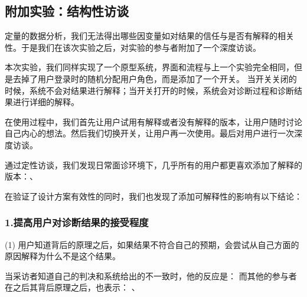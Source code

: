 









\subsection{附加实验：结构性访谈}

定量的数据分析，我们无法得出哪些因变量如对结果的信任与是否有解释的相关性。于是我们在该次实验之后，对实验的参与者附加了一个深度访谈。

本次实验，我们同样实现了一个原型系统，界面和流程与上一个实验完全相同，但是去掉了用户登录时的随机分配用户角色，而是添加了一个开关。
当开关关闭的时候，系统不会对结果进行解释；当开关打开的时候，系统会对诊断过程和诊断结果进行详细的解释。

在使用过程中，我们首先让用户试用有解释或者没有解释的版本，让用户随时讨论自己内心的想法。然后我们切换开关，让用户再一次使用。最后对用户进行一次深度访谈。

通过定性访谈，我们发现日常面诊环境下，几乎所有的用户都更喜欢添加了解释的版本：、

在验证了设计方案有效性的同时，我们也发现了添加可解释性的影响有以下结论：

\subsubsection{1.提高用户对诊断结果的接受程度}

(1) 用户知道背后的原理之后，如果结果不符合自己的预期，会尝试从自己方面的原因解释为什么不是这个结果。

当采访者知道自己的判决和系统给出的不一致时，他的反应是： 而其他的参与者在之后其背后原理之后，也表示：
、


